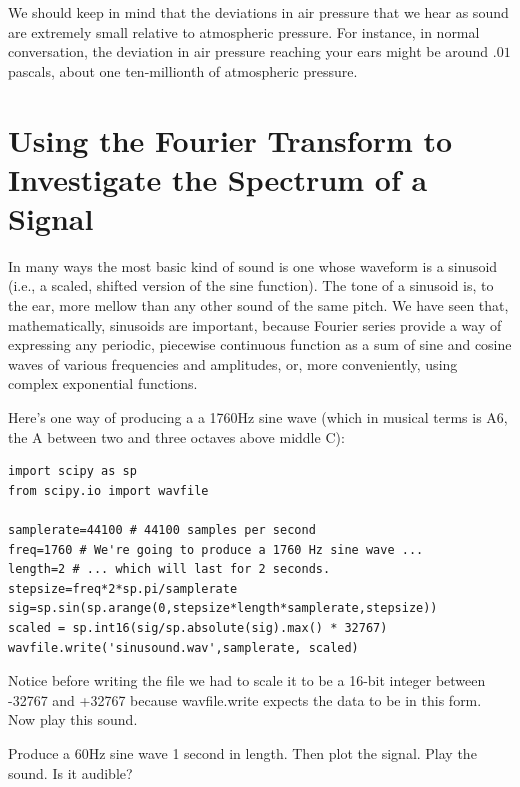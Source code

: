 We should keep in mind that the deviations in air pressure that we hear as sound are extremely small relative to atmospheric pressure. For instance, in normal conversation, the deviation in air pressure reaching your ears might be around $.01$ pascals, about one ten-millionth of atmospheric pressure.


\section*{Using the Fourier Transform to Investigate the Spectrum of a Signal}

In many ways the most basic kind of sound is one whose waveform is a sinusoid (i.e., a scaled, shifted version of the sine function). The tone of a sinusoid is, to the ear, more mellow than any other sound of the same pitch. We have seen that, mathematically, sinusoids are important, because Fourier series provide a way of expressing any periodic, piecewise continuous function as a sum of sine and cosine waves of various frequencies and amplitudes, or, more conveniently, using complex exponential functions.

Here's one way of producing a a 1760Hz sine wave (which in musical terms is A6, the A between two and three octaves above middle C):

\begin{lstlisting}
import scipy as sp
from scipy.io import wavfile

samplerate=44100 # 44100 samples per second
freq=1760 # We're going to produce a 1760 Hz sine wave ...
length=2 # ... which will last for 2 seconds.
stepsize=freq*2*sp.pi/samplerate
sig=sp.sin(sp.arange(0,stepsize*length*samplerate,stepsize))
scaled = sp.int16(sig/sp.absolute(sig).max() * 32767)
wavfile.write('sinusound.wav',samplerate, scaled)
\end{lstlisting}

Notice before writing the file we had to scale it to be a 16-bit integer between -32767 and +32767 because wavfile.write expects the data to be in this form.  Now play this sound.

\begin{problem}
Produce a 60Hz sine wave 1 second in length. Then plot the signal. Play the sound. Is it audible?
\end{problem}


